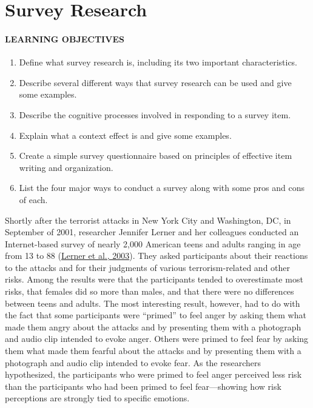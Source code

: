 \documentclass[
]{krantz}
\providecommand{\tightlist}{%
  \setlength{\itemsep}{0pt}\setlength{\parskip}{0pt}}
\begin{document}
\hypertarget{survey-research}{%
\section{Survey Research}\label{survey-research}}

\hypertarget{learning-objectives-25}{%
\paragraph*{LEARNING OBJECTIVES}\label{learning-objectives-25}}

\begin{enumerate}
\def\labelenumi{\arabic{enumi}.}
\tightlist
\item
  Define what survey research is, including its two important characteristics.
\item
  Describe several different ways that survey research can be used and give some examples.
\item
  Describe the cognitive processes involved in responding to a survey item.
\item
  Explain what a context effect is and give some examples.
\item
  Create a simple survey questionnaire based on principles of effective item writing and organization.
\item
  List the four major ways to conduct a survey along with some pros and cons of each.
\end{enumerate}

Shortly after the terrorist attacks in New York City and Washington, DC, in September of 2001, researcher Jennifer Lerner and her colleagues conducted an Internet-based survey of nearly 2,000 American teens and adults ranging in age from 13 to 88 (\protect\hyperlink{ref-lerner2003effects}{Lerner et al., 2003}). They asked participants about their reactions to the attacks and for their judgments of various terrorism-related and other risks. Among the results were that the participants tended to overestimate most risks, that females did so more than males, and that there were no differences between teens and adults. The most interesting result, however, had to do with the fact that some participants were ``primed'' to feel anger by asking them what made them angry about the attacks and by presenting them with a photograph and audio clip intended to evoke anger. Others were primed to feel fear by asking them what made them fearful about the attacks and by presenting them with a photograph and audio clip intended to evoke fear. As the researchers hypothesized, the participants who were primed to feel anger perceived less risk than the participants who had been primed to feel fear---showing how risk perceptions are strongly tied to specific emotions.
\end{document}
